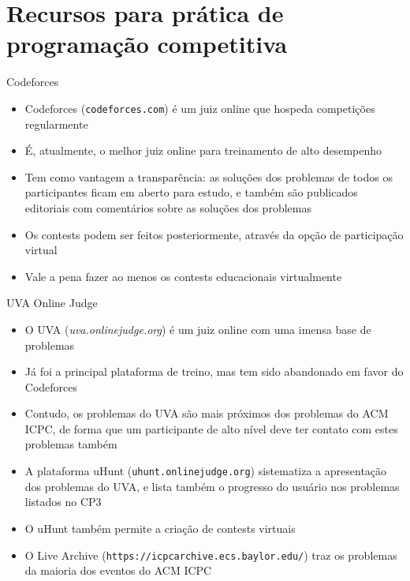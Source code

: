 \section{Recursos para prática de programação competitiva}

\begin{frame}[fragile]{Codeforces}

    \begin{itemize}
        \item Codeforces (\texttt{codeforces.com}) é um juiz online que hospeda competições
            regularmente

        \item É, atualmente, o melhor juiz online para treinamento de alto desempenho

        \item Tem como vantagem a transparência: as soluções dos problemas de todos os
            participantes ficam em aberto para estudo, e também são publicados editoriais
            com comentários sobre as soluções dos problemas

        \item Os contests podem ser feitos posteriormente, através da opção de participação
            virtual

        \item Vale a pena fazer ao menos os contests educacionais virtualmente

    \end{itemize}

\end{frame}

\begin{frame}[fragile]{UVA Online Judge}

    \begin{itemize}
        \item O UVA (\textit{uva.onlinejudge.org}) é um juiz online com uma imensa base de
            problemas

        \item Já foi a principal plataforma de treino, mas tem sido abandonado em favor do
            Codeforces

        \item Contudo, os problemas do UVA são mais próximos dos problemas do ACM ICPC,
            de forma que um participante de alto nível deve ter contato com estes problemas
            também

        \item A plataforma uHunt (\texttt{uhunt.onlinejudge.org}) sistematiza a apresentação
            dos problemas do UVA, e lista também o progresso do usuário nos problemas listados
            no CP3

        \item O uHunt também permite a criação de contests virtuais

        \item O Live Archive (\texttt{https://icpcarchive.ecs.baylor.edu/}) traz os problemas
            da maioria dos eventos do ACM ICPC
    \end{itemize}

\end{frame}

